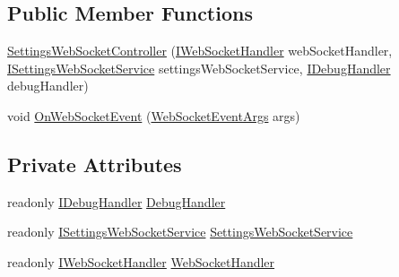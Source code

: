 \subsection*{Public Member Functions}
\begin{DoxyCompactItemize}
\item 
\mbox{\hyperlink{class_little_weeb_library_1_1_controllers_1_1_sub_controllers_1_1_settings_web_socket_controller_a81701a5495065390949f1672fcac1f40}{Settings\+Web\+Socket\+Controller}} (\mbox{\hyperlink{interface_little_weeb_library_1_1_handlers_1_1_i_web_socket_handler}{I\+Web\+Socket\+Handler}} web\+Socket\+Handler, \mbox{\hyperlink{interface_little_weeb_library_1_1_services_1_1_i_settings_web_socket_service}{I\+Settings\+Web\+Socket\+Service}} settings\+Web\+Socket\+Service, \mbox{\hyperlink{interface_little_weeb_library_1_1_handlers_1_1_i_debug_handler}{I\+Debug\+Handler}} debug\+Handler)
\item 
void \mbox{\hyperlink{class_little_weeb_library_1_1_controllers_1_1_sub_controllers_1_1_settings_web_socket_controller_a39b333aee248388fd295a8511486c76e}{On\+Web\+Socket\+Event}} (\mbox{\hyperlink{class_little_weeb_library_1_1_event_arguments_1_1_web_socket_event_args}{Web\+Socket\+Event\+Args}} args)
\end{DoxyCompactItemize}
\subsection*{Private Attributes}
\begin{DoxyCompactItemize}
\item 
readonly \mbox{\hyperlink{interface_little_weeb_library_1_1_handlers_1_1_i_debug_handler}{I\+Debug\+Handler}} \mbox{\hyperlink{class_little_weeb_library_1_1_controllers_1_1_sub_controllers_1_1_settings_web_socket_controller_aa9dbf3ffb60b7fad884bbdb3c553b1e7}{Debug\+Handler}}
\item 
readonly \mbox{\hyperlink{interface_little_weeb_library_1_1_services_1_1_i_settings_web_socket_service}{I\+Settings\+Web\+Socket\+Service}} \mbox{\hyperlink{class_little_weeb_library_1_1_controllers_1_1_sub_controllers_1_1_settings_web_socket_controller_a6d733d35bf981733110071fe2fe8129c}{Settings\+Web\+Socket\+Service}}
\item 
readonly \mbox{\hyperlink{interface_little_weeb_library_1_1_handlers_1_1_i_web_socket_handler}{I\+Web\+Socket\+Handler}} \mbox{\hyperlink{class_little_weeb_library_1_1_controllers_1_1_sub_controllers_1_1_settings_web_socket_controller_a38ef1d85352aa67696205ad34fdef40d}{Web\+Socket\+Handler}}
\end{DoxyCompactItemize}


